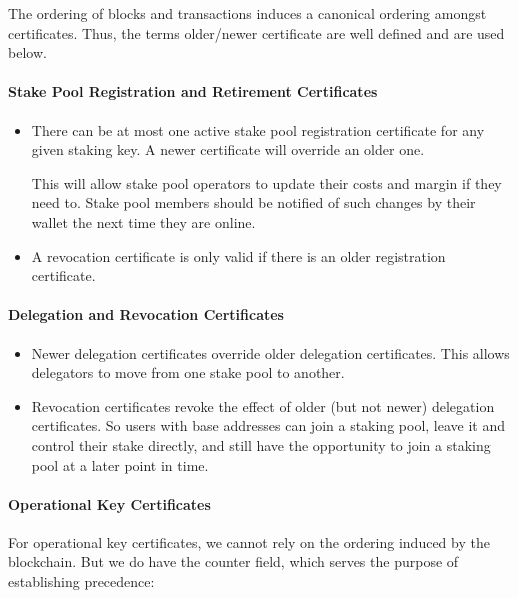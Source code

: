 \documentclass[11pt,a4paper]{article}
\begin{document}
The ordering of blocks and transactions induces a canonical ordering
amongst certificates. Thus, the terms older/newer certificate are well
defined and are used below.

\paragraph{Stake Pool Registration and Retirement Certificates}
\label{stake-pool-registration-and-retirement-certificates}

\begin{itemize}
\item
  There can be at most one active stake pool registration certificate
  for any given staking key. A newer certificate will override an older
  one.

  This will allow stake pool operators to update their costs and margin
  if they need to. Stake pool members should be notified of such changes
  by their wallet the next time they are online.
\item
  A revocation certificate is only valid if there is an older
  registration certificate.
\end{itemize}

\paragraph{Delegation and Revocation Certificates}
\label{delegation-and-revocation-certificates}

\begin{itemize}
\item
  Newer delegation certificates override older delegation
  certificates. This allows delegators to move from one stake pool to
  another.
\item
  Revocation certificates revoke the effect of older (but not newer)
  delegation certificates. So users with base addresses can join a
  staking pool, leave it and control their stake directly, and still
  have the opportunity to join a staking pool at a later point in time.
\end{itemize}

\paragraph{Operational Key Certificates}
\label{operational-key-certificates-1}

For operational key certificates, we cannot rely on the ordering induced by
the blockchain. But we do have the counter field, which serves the
purpose of establishing precedence:
\end{document}
